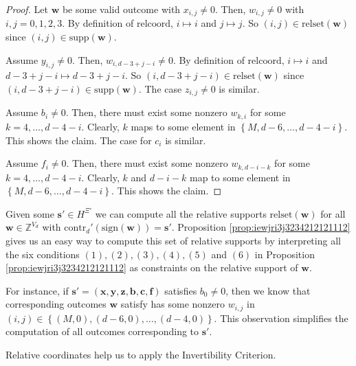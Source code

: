 \begin{proof}
    Let \( \mathbf{w} \) be some valid outcome with \( x_{i,j} \neq 0 \). Then, \( w_{i,j} \neq 0 \) with \( i,j = 0, 1,2, 3 \). By definition of \( \mathrm{relcoord} \), \( i \mapsto i \) and \( j \mapsto j \). So \( (i,j) \in \mathrm{relset}(\mathbf{w}) \) since \( (i,j) \in \mathrm{supp}(\mathbf{w}) \).

    Assume \( y_{i,j} \neq 0 \). Then, \( w_{i, d-3+j-i} \neq 0 \). By definition of \( \mathrm{relcoord} \), \( i \mapsto i \) and \( d-3+j-i \mapsto d-3+j-i \). So \( (i,d-3+j-i) \in \mathrm{relset}(\mathbf{w}) \) since \( (i,d-3+j-i) \in \mathrm{supp}(\mathbf{w}) \). The case \( z_{i,j} \neq 0 \) is similar.

    Assume \( b_{i} \neq 0 \). Then, there must exist some nonzero \( w_{k, i} \) for some \( k = 4, \dots, d-4-i \). Clearly, \( k \) maps to some element in \( \left\{ M, d-6, \dots, d-4-i \right\} \). This shows the claim. The case for \( c_i \) is similar.

    Assume \( f_{i} \neq 0 \). Then, there must exist some nonzero \( w_{k, d-i-k} \) for some \( k = 4, \dots, d-4-i \). Clearly, \( k \) and \( d-i-k \)  map to some element in \( \left\{ M, d-6, \dots, d-4-i \right\} \). This shows the claim.
\end{proof}

\begin{remark}
    Given some \( \mathbf{s}' \in {H}^{\Xi'} \) we can compute all the relative supports \( \mathrm{relset}(\mathbf{w}) \) for all \( \mathbf{w} \in \mathbb{Z}^{V_d} \) with \( \mathrm{contr}_d'(\mathrm{sign}(\mathbf{w})) = \mathbf{s}'\). Proposition \ref{prop:iewjri3j3234212121112} gives us an easy way to compute this set of relative supports by interpreting all the six conditions \( (1), (2), (3), (4), (5) \) and \( (6) \) in Proposition \ref{prop:iewjri3j3234212121112} as constraints on the relative support of \( \mathbf{w} \). 

    For instance, if \( \mathbf{s}' = (\mathbf{x},\mathbf{y},\mathbf{z},\mathbf{b},\mathbf{c},\mathbf{f} ) \) satisfies \( b_0 \neq 0 \), then we know that corresponding outcomes \( \mathbf{w} \) satisfy has some nonzero \( w_{i,j} \) in  \( (i,j) \in \left\{ (M,0), (d-6, 0), \dots, (d-4, 0) \right\} \). This observation simplifies the computation of all outcomes corresponding to \( \mathbf{s}' \).
\end{remark}

Relative coordinates help us to apply the Invertibility Criterion. 


